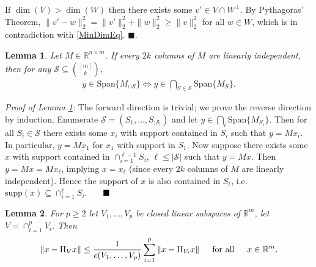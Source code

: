 \documentclass[journal,onecolumn]{IEEEtran}
\newtheorem{lemma}{Lemma}
\begin{document}
If $\dim(V) > \dim(W)$ then there exists some $v' \in V \cap W^\perp$. By Pythagoras' Theorem, $\|v' - w\|_2^2 = \|v'\|_2^2 + \|w\|_2^2 \geq \|v\|_2^2$ for all $w \in W$, which is in contradiction with \eqref{MinDimEq}. \indent $\blacksquare$.


\begin{lemma}\label{SpanIntersectionLemma}
Let $M \in \mathbb{R}^{n \times m}$. If every $2k$ columns of $M$ are linearly independent, then for any $\mathcal{S} \subseteq {[m] \choose k}$,
\begin{align}
y \in \text{Span}\{M_{\cap \mathcal{S}}\}  \Longleftrightarrow y \in \bigcap_{S \in \mathcal{S}} \text{Span}\{M_S\}.
\end{align}
\end{lemma}

\emph{Proof of Lemma \ref{SpanIntersectionLemma}:} The forward direction is trivial; we prove the reverse direction by induction. Enumerate $\mathcal{S} = (S_1, \ldots, S_{|\mathcal{S}|})$ and let $y \in \bigcap_i \text{Span}\{M_{S_i}\}$. Then for all $S_i \in \mathcal{S}$ there exists some $x_i$ with support contained in $S_i$ such that $y = Mx_i$. In particular, $y = Mx_1$ for $x_1$ with support in $S_1$. Now suppose there exists some $x$ with support contained in $\cap_{i=1}^{\ell-1}S_i$, $\ell \leq |\mathcal{S}|$ such that $y = Mx$. Then $y = Mx = Mx_\ell$, implying $x = x_\ell$ (since every $2k$ columns of $M$ are linearly independent). Hence the support of $x$ is also contained in  $S_\ell$, i.e. $\text{supp}(x) \subseteq \cap_{i=1}^\ell S_i$. $\indent \blacksquare$


\begin{lemma}\label{DistanceToIntersectionLemma}
For $p \geq 2$ let $V_1, \ldots, V_p$ be closed linear subspaces of $\mathbb{R}^m$, let $V = \cap_{i=1}^p V_i$. Then 
\begin{align}\label{DTILeq}
\|x - \Pi_V x\| \leq \frac{1}{c(V_1, \ldots, V_p)} \sum_{i=1}^p \|x - \Pi_{V_i} x\| \indent \text{for all} \indent x \in \mathbb{R}^m.
\end{align}
\end{lemma}
\end{document}
